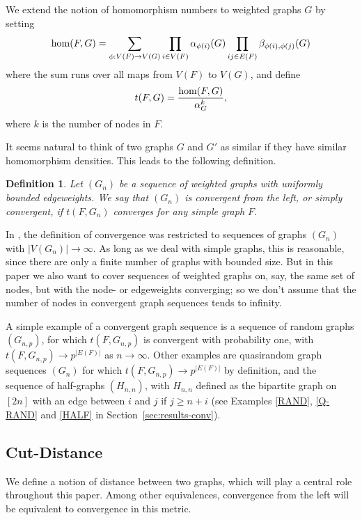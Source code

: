\documentclass[12pt]{article}
\newtheorem{definition}[theorem]{Definition}
\numberwithin{equation}{section}
\def\hom{{\rm hom}}
\begin{document}
We extend the  notion of homomorphism numbers to weighted graphs $G$
by setting
\begin{equation}
\label{hom-def} \hom(F,G)=\sum_{\phi:V(F)\to V(G)} \prod_{i\in V(F)}
\alpha_{\phi(i)}(G) \prod_{ij\in E(F)}\beta_{\phi(i),\phi(j)}(G)
\end{equation}
where the sum runs over all maps from $V(F)$ to $V(G)$,
and define
\begin{equation}
\label{t-def} t(F,G)=\frac{\hom(F,G)}{\alpha_G^k},
\end{equation}
where $k$ is the number of nodes in $F$.

It seems natural to think of two graphs $G$ and $G'$ as similar if
they have similar homomorphism densities.  This leads to the
following definition.

\begin{definition}
Let $(G_n)$ be a sequence of weighted graphs with uniformly bounded
edgeweights.  We say that $(G_n)$ is {\it convergent from the left},
or simply {\it convergent}, if $t(F,G_n)$ converges for any simple
graph $F$.
\end{definition}

In \cite{BCLSSV}, the definition of convergence was restricted to
sequences of graphs $(G_n)$ with $|V(G_n)|\to\infty$. As long as we
deal with simple graphs, this is reasonable, since there are only a
finite number of graphs with bounded size. But in this paper we also
want to cover sequences of weighted graphs on, say, the same set of
nodes, but with the node- or edgeweights converging; so we don't
assume that the number of nodes in convergent graph sequences tends
to infinity.

A simple example of a convergent graph sequence is a sequence of
random graphs $(G_{n,p})$, for which $t(F,G_{n,p})$ is convergent
with probability one, with $t(F,G_{n,p})\to p^{|E(F)|}$ as
$n\to\infty$. Other examples are quasirandom graph sequences $(G_n)$
for which $t(F,G_{n,p})\to p^{|E(F)|}$ by definition, and the
sequence of half-graphs $(H_{n,n})$, with $H_{n,n}$ defined as the
bipartite graph on $[2n]$ with an edge between $i$ and $j$ if $j\geq
n+i$ (see Examples \ref{RAND}, \ref{Q-RAND} and \ref{HALF} in
Section~\ref{sec:results-conv}).


\subsection{Cut-Distance}
\label{sec:results-Metric-Conv}


We define a notion of distance between two graphs, which will play a
central role throughout this paper. Among other
equivalences, convergence from
the left will be equivalent to convergence in this metric.
\end{document}
